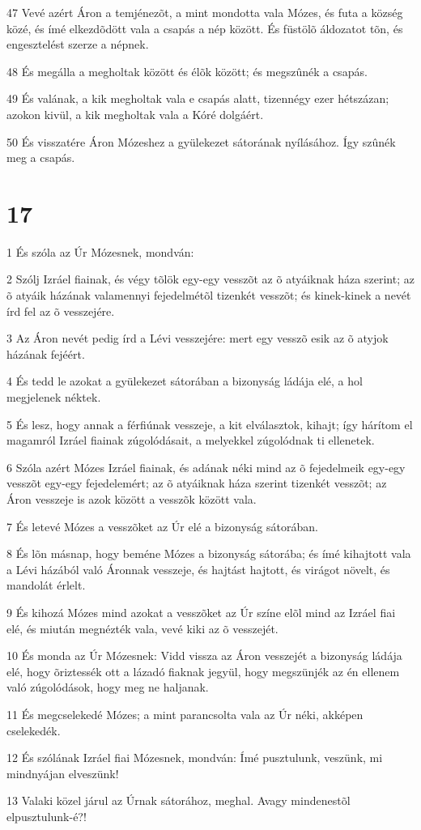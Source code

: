 \par 47 Vevé azért Áron a temjénezõt, a mint mondotta vala Mózes, és futa a község közé, és ímé elkezdõdött vala a csapás a nép között. És füstölõ áldozatot tõn, és engesztelést szerze a népnek.
\par 48 És megálla a megholtak között és élõk között; és megszûnék a csapás.
\par 49 És valának, a kik megholtak vala e csapás alatt, tizennégy ezer hétszázan; azokon kivül, a kik megholtak vala a Kóré dolgáért.
\par 50 És visszatére Áron Mózeshez a gyülekezet sátorának nyílásához. Így szûnék meg a csapás.

\chapter{17}

\par 1 És szóla az Úr Mózesnek, mondván:
\par 2 Szólj Izráel fiainak, és végy tõlök egy-egy vesszõt az õ atyáiknak háza szerint; az õ atyáik házának valamennyi fejedelmétõl tizenkét vesszõt; és kinek-kinek a nevét írd fel az õ vesszejére.
\par 3 Az Áron nevét pedig írd a Lévi vesszejére: mert egy vesszõ esik az õ atyjok házának fejéért.
\par 4 És tedd le azokat a gyülekezet sátorában a bizonyság ládája elé, a hol megjelenek néktek.
\par 5 És lesz, hogy annak a férfiúnak vesszeje, a kit elválasztok, kihajt; így hárítom el magamról Izráel fiainak zúgolódásait, a melyekkel zúgolódnak ti ellenetek.
\par 6 Szóla azért Mózes Izráel fiainak, és adának néki mind az õ fejedelmeik egy-egy vesszõt egy-egy fejedelemért; az õ atyáiknak háza szerint tizenkét vesszõt; az Áron vesszeje is azok között a vesszõk között vala.
\par 7 És letevé Mózes a vesszõket az Úr elé a bizonyság sátorában.
\par 8 És lõn másnap, hogy beméne Mózes a bizonyság sátorába; és ímé kihajtott vala a Lévi házából való Áronnak vesszeje, és hajtást hajtott, és virágot növelt, és mandolát érlelt.
\par 9 És kihozá Mózes mind azokat a vesszõket az Úr színe elõl mind az Izráel fiai elé, és miután megnézték vala, vevé kiki az õ vesszejét.
\par 10 És monda az Úr Mózesnek: Vidd vissza az Áron vesszejét a bizonyság ládája elé, hogy õriztessék ott a lázadó fiaknak jegyül, hogy megszünjék az én ellenem való zúgolódások, hogy meg ne haljanak.
\par 11 És megcselekedé Mózes; a mint parancsolta vala az Úr néki, akképen cselekedék.
\par 12 És szólának Izráel fiai Mózesnek, mondván: Ímé pusztulunk, veszünk, mi mindnyájan elveszünk!
\par 13 Valaki közel járul az Úrnak sátorához, meghal. Avagy mindenestõl elpusztulunk-é?!

